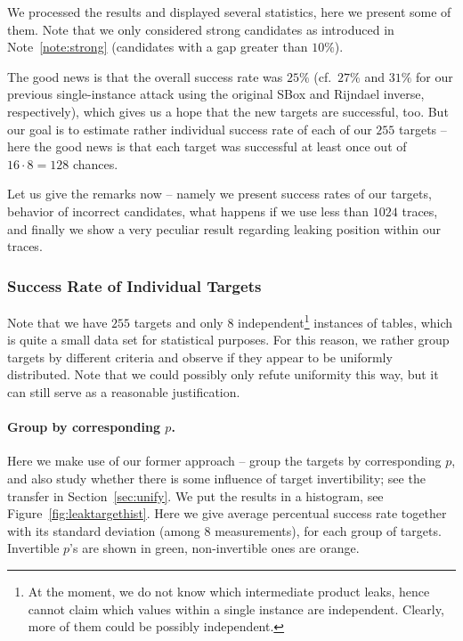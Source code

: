We processed the results and displayed several statistics, here we present some of them. Note that we only considered strong candidates as introduced in Note~\ref{note:strong} (candidates with a gap greater than $10\%$).

The good news is that the overall success rate was $25\%$ (cf.\ $27\%$ and $31\%$ for our previous single-instance attack using the original SBox and Rijndael inverse, respectively), which gives us a hope that the new targets are successful, too. But our goal is to estimate rather individual success rate of each of our $255$ targets -- here the good news is that each target was successful at least once out of $16\cdot8=128$ chances.

Let us give the remarks now -- namely we present success rates of our targets, behavior of incorrect candidates, what happens if we use less than $1024$ traces, and finally we show a very peculiar result regarding leaking position within our traces.

\subsubsection{Success Rate of Individual Targets}
	
	Note that we have $255$ targets and only $8$ independent\footnote{At the moment, we do not know which intermediate product leaks, hence cannot claim which values within a single instance are independent. Clearly, more of them could be possibly independent.} instances of tables, which is quite a small data set for statistical purposes. For this reason, we rather group targets by different criteria and observe if they appear to be uniformly distributed. Note that we could possibly only refute uniformity this way, but it can still serve as a reasonable justification.
	
	\paragraph{Group by corresponding $p$.}
	
	Here we make use of our former approach -- group the targets by corresponding $p$, and also study whether there is some influence of target invertibility; see the transfer in Section~\ref{sec:unify}. We put the results in a histogram, see Figure~\ref{fig:leaktargethist}. Here we give average percentual success rate together with its standard deviation (among $8$ measurements), for each group of targets. Invertible $p$'s are shown in green, non-invertible ones are orange.
	
